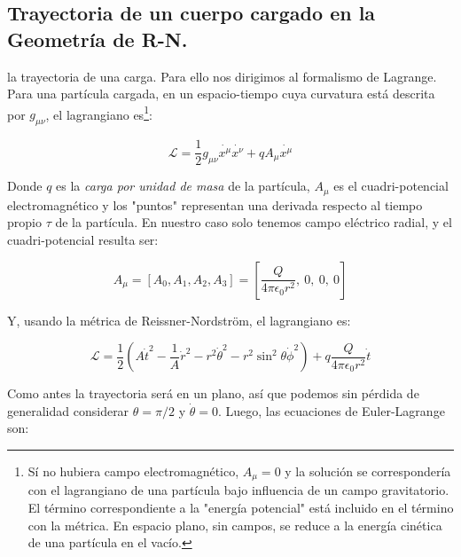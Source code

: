 \subsection*{\textbf{Trayectoria de un cuerpo cargado en la Geometría de R-N.}}
 la trayectoria de una carga. Para ello nos dirigimos al formalismo de Lagrange. Para una partícula cargada, en un espacio-tiempo cuya curvatura está descrita por $g_{\mu\nu}$, el lagrangiano es\footnote{Sí no hubiera campo electromagnético, $A_\mu=0$ y la solución se correspondería con el lagrangiano de una partícula bajo influencia de un campo gravitatorio. El término correspondiente a la "energía potencial" está incluido en el término con la métrica. En espacio plano, sin campos, se reduce a la energía cinética de una partícula en el vacío.}:

\begin{equation}
    \mathcal{L} = \frac{1}{2} g_{\mu\nu} \dot{x^\mu}\dot{x^\nu} + q A_\mu \dot{x^\mu}
\end{equation}

Donde $q$ es la \textit{carga por unidad de masa} de la partícula, $A_\mu$ es el cuadri-potencial electromagnético y los "puntos" representan una derivada respecto al tiempo propio $\tau$ de la partícula. En nuestro caso solo tenemos campo eléctrico radial, y el cuadri-potencial resulta ser:
  
\begin{equation}
    A_\mu=[A_0,A_1,A_2,A_3]=\left[\frac{Q}{4\pi\epsilon_0 r^2},\ 0,\ 0,\ 0 \right]
\end{equation}

Y, usando la métrica de Reissner-Nordström, el lagrangiano es:

\begin{equation}
    \mathcal{L} = \frac{1}{2}\left( A\dot{t}^2 - \frac{1}{A} \dot{r}^2 - r^2 \dot{\theta}^2 - r^2 \sin^2{\theta} \dot{\phi}^2 \right) + q \frac{Q}{4\pi\epsilon_0 r^2} \dot{t}
\end{equation}

Como antes la trayectoria será en un plano, así que podemos sin pérdida de generalidad considerar $\theta=\pi/2$ y $\dot{\theta}=0$. Luego, las ecuaciones de Euler-Lagrange son:


